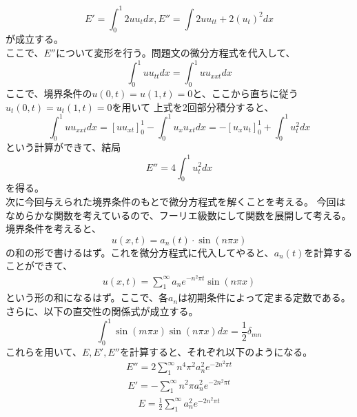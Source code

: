 \documentclass{jarticle}
\begin{document}
\section{}
\subsection{}
\begin{equation}
E'=\int^1_0 2uu_t dx,E''=\int2uu_{tt}+2(u_t)^2 dx
\end{equation}
が成立する。
\\
ここで、$E''$について変形を行う。問題文の微分方程式を代入して、
\begin{equation}
\int^1_0 uu_{tt} dx = \int^1_0 uu_{xxt} dx
\end{equation}
ここで、境界条件の$u(0,t)=u(1,t)=0$と、ここから直ちに従う$u_t(0,t)=u_t(1,t)=0$を用いて
上式を2回部分積分すると、
\begin{equation}
\int^1_0 uu_{xxt} dx = [uu_{xt}]^1_0 - \int^1_0 u_xu_{xt}dx = -[ u_xu_t ]^1_0
+\int^1_0 u_t^2 dx
\end{equation}
という計算ができて、結局
\begin{equation}
E'' = 4\int^1_0 u_t^2 dx
\end{equation}
を得る。
\\
次に今回与えられた境界条件のもとで微分方程式を解くことを考える。
今回はなめらかな関数を考えているので、フーリエ級数にして関数を展開して考える。
境界条件を考えると、
\begin{equation}
u(x,t) = a_n(t)\cdot \sin(n\pi x)
\end{equation}
の和の形で書けるはず。これを微分方程式に代入してやると、$a_n(t)$を計算することができて、
\begin{eqnarray}
u(x,t) = \sum^\infty_1 a_n e^{-n^2\pi t} \sin(n\pi x)
\end{eqnarray}
という形の和になるはず。ここで、各$a_n$は初期条件によって定まる定数である。
さらに、以下の直交性の関係式が成立する。
\begin{equation}
\int^1_0 \sin(m\pi x)\sin(n\pi x) dx = \frac{1}{2}\delta_{mn}
\end{equation}
これらを用いて、$E,E',E''$を計算すると、それぞれ以下のようになる。
\begin{eqnarray}
E''=2\sum^\infty_1 n^4\pi^2a_n^2e^{-2n^2\pi t}
\end{eqnarray}
\begin{eqnarray}
E'= -\sum^\infty_1 n^2\pi a_n^2 e^{-2n^2\pi t}
\end{eqnarray}
\begin{eqnarray}
E = \frac{1}{2}\sum^\infty_1 a_n^2 e^{-2n^2\pi t}
\end{eqnarray}
\end{document}
